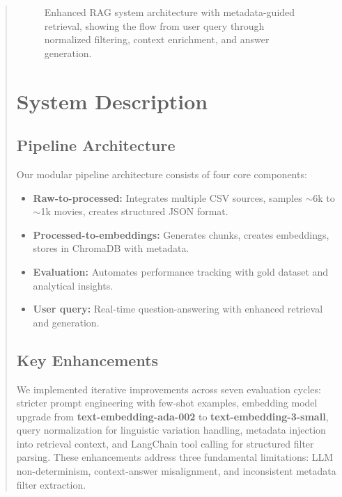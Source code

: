 \documentclass[11pt]{article}
\begin{document}
\begin{abstract}
\begin{figure}[!ht]
\caption{Enhanced RAG system architecture with metadata-guided retrieval, showing the flow from user query through normalized filtering, context enrichment, and answer generation.}
\label{fig:architecture}
\end{figure}

\section{System Description}

\subsection{Pipeline Architecture}

Our modular pipeline architecture consists of four core components:

\begin{itemize}
\setlength{\itemsep}{0pt}
\setlength{\parsep}{0pt}
\item \textbf{Raw-to-processed:} Integrates multiple CSV sources, samples $\sim$6k to $\sim$1k movies, creates structured JSON format.
\item \textbf{Processed-to-embeddings:} Generates chunks, creates embeddings, stores in ChromaDB with metadata.
\item \textbf{Evaluation:} Automates performance tracking with gold dataset and analytical insights.
\item \textbf{User query:} Real-time question-answering with enhanced retrieval and generation.
\end{itemize}

\subsection{Key Enhancements}

We implemented iterative improvements across seven evaluation cycles: stricter prompt engineering with few-shot examples, embedding model upgrade from \textbf{text-embedding-ada-002} to \textbf{text-embedding-3-small}, query normalization for linguistic variation handling, metadata injection into retrieval context, and LangChain tool calling for structured filter parsing. These enhancements address three fundamental limitations: LLM non-determinism, context-answer misalignment, and inconsistent metadata filter extraction.


\end{abstract}
\end{document}
